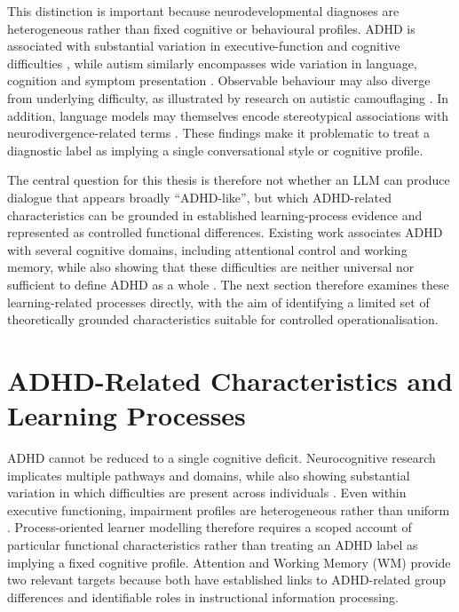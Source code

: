 This distinction is important because neurodevelopmental diagnoses are heterogeneous rather than fixed cognitive or behavioural profiles. ADHD is associated with substantial variation in executive-function and cognitive difficulties \cite{willcutt-etal-2005-validity,kofler-etal-2019-heterogeneity}, while autism similarly encompasses wide variation in language, cognition and symptom presentation \cite{rabot-etal-2023-autism-heterogeneity}. Observable behaviour may also diverge from underlying difficulty, as illustrated by research on autistic camouflaging \cite{cook-etal-2021-camouflaging}. In addition, language models may themselves encode stereotypical associations with neurodivergence-related terms \cite{brandsen-etal-2024-neurodivergence-bias}. These findings make it problematic to treat a diagnostic label as implying a single conversational style or cognitive profile.

The central question for this thesis is therefore not whether an LLM can produce dialogue that appears broadly ``ADHD-like'', but which ADHD-related characteristics can be grounded in established learning-process evidence and represented as controlled functional differences. Existing work associates ADHD with several cognitive domains, including attentional control and working memory, while also showing that these difficulties are neither universal nor sufficient to define ADHD as a whole \cite{willcutt-etal-2005-validity,kofler-etal-2019-heterogeneity}. The next section therefore examines these learning-related processes directly, with the aim of identifying a limited set of theoretically grounded characteristics suitable for controlled operationalisation.

\section[ADHD-Related Characteristics and Learning Processes]{ADHD-Related Characteristics and\\ Learning Processes}
\label{sec:adhd-learning-processes}

ADHD cannot be reduced to a single cognitive deficit. Neurocognitive research implicates multiple pathways and domains, while also showing substantial variation in which difficulties are present across individuals \cite{sonuga-barke-2003-dual,willcutt-etal-2005-validity,luo-etal-2019-heterogeneity}. Even within executive functioning, impairment profiles are heterogeneous rather than uniform \cite{kofler-etal-2019-heterogeneity}. Process-oriented learner modelling therefore requires a scoped account of particular functional characteristics rather than treating an ADHD label as implying a fixed cognitive profile. Attention and Working Memory (WM) provide two relevant targets because both have established links to ADHD-related group differences and identifiable roles in instructional information processing.

